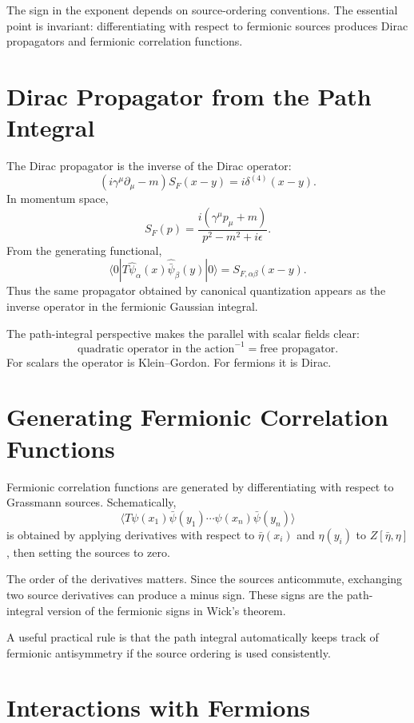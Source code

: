 The sign in the exponent depends on source-ordering conventions. The essential
point is invariant: differentiating with respect to fermionic sources produces
Dirac propagators and fermionic correlation functions.

\section{Dirac Propagator from the Path Integral}

The Dirac propagator is the inverse of the Dirac operator:
\[
    (i\gamma^\mu\partial_\mu-m)S_F(x-y)=i\delta^{(4)}(x-y).
\]
In momentum space,
\[
    S_F(p)=\frac{i(\gamma^\mu p_\mu+m)}{p^2-m^2+i\epsilon}.
\]
From the generating functional,
\[
    \langle0|T\hat\psi_\alpha(x)\hat{\bar\psi}_\beta(y)|0\rangle
    = S_{F,\alpha\beta}(x-y).
\]
Thus the same propagator obtained by canonical quantization appears as the
inverse operator in the fermionic Gaussian integral.

The path-integral perspective makes the parallel with scalar fields clear:
\[
    \text{quadratic operator in the action}^{-1}
    = \text{free propagator}.
\]
For scalars the operator is Klein--Gordon. For fermions it is Dirac.

\section{Generating Fermionic Correlation Functions}

Fermionic correlation functions are generated by differentiating with respect to
Grassmann sources. Schematically,
\[
    \langle T\psi(x_1)\bar\psi(y_1)\cdots\psi(x_n)\bar\psi(y_n)\rangle
\]
is obtained by applying derivatives with respect to \(\bar\eta(x_i)\) and
\(\eta(y_i)\) to \(Z[\bar\eta,\eta]\), then setting the sources to zero.

The order of the derivatives matters. Since the sources anticommute, exchanging
two source derivatives can produce a minus sign. These signs are the
path-integral version of the fermionic signs in Wick's theorem.

A useful practical rule is that the path integral automatically keeps track of
fermionic antisymmetry if the source ordering is used consistently.

\section{Interactions with Fermions}

